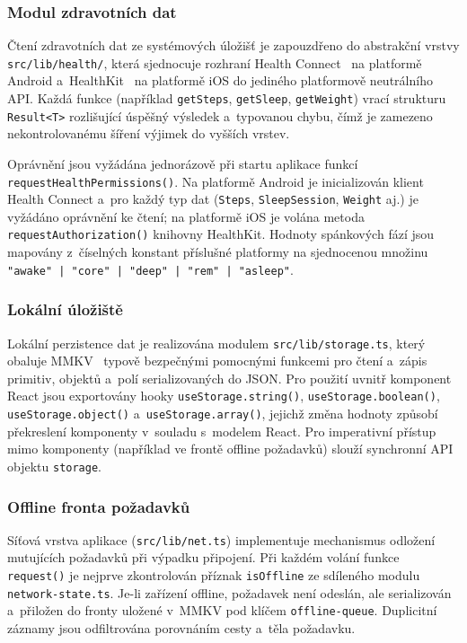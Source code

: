 \subsubsection{Modul zdravotních dat}

{\sloppy
Čtení zdravotních dat ze systémových úložišť je zapouzdřeno do abstrakční
vrstvy \texttt{src/lib/}\allowbreak\texttt{health/}, která sjednocuje rozhraní
Health Connect~\cite{healthconnect2024} na platformě Android
a~HealthKit~\cite{healthkit2024} na platformě iOS do jediného
platformově neutrálního API. Každá funkce (například \texttt{getSteps}, 
\texttt{getSleep}, \texttt{getWeight}) vrací strukturu
\texttt{Result<T>} rozlišující úspěšný výsledek a~typovanou chybu,
čímž je zamezeno nekontrolovanému šíření výjimek do vyšších vrstev.
}

Oprávnění jsou vyžádána jednorázově při startu aplikace funkcí
\texttt{requestHealth\-Permissions()}. Na platformě Android je inicializován
klient Health Connect a~pro každý typ dat (\texttt{Steps},
\texttt{SleepSession}, \texttt{Weight} aj.) je vyžádáno oprávnění ke čtení;
na platformě iOS je volána metoda \texttt{requestAuthorization()} knihovny
HealthKit. Hodnoty spánkových fází jsou mapovány z~číselných konstant
příslušné platformy na sjednocenou množinu
\texttt{"awake"\allowbreak\ | "core"\allowbreak\ | "deep"\allowbreak\ | "rem"\allowbreak\ | "asleep"}.

\subsubsection{Lokální úložiště}

Lokální perzistence dat je realizována modulem \texttt{src/lib/storage.ts},
který obaluje MMKV~\cite{mmkv2024} typově bezpečnými pomocnými funkcemi
pro čtení a~zápis primitiv, objektů a~polí serializovaných do JSON.
Pro použití uvnitř komponent React jsou exportovány hooky
\texttt{useStorage.string()}, \texttt{useStorage.boolean()},
\texttt{useStorage.object()} a~\texttt{useStorage.array()}, jejichž
změna hodnoty způsobí překreslení komponenty v~souladu s~modelem React.
Pro imperativní přístup mimo komponenty (například ve frontě offline
požadavků) slouží synchronní API objektu \texttt{storage}.

\subsubsection{Offline fronta požadavků}

Síťová vrstva aplikace (\texttt{src/lib/net.ts}) implementuje mechanismus
odložení mutujících požadavků při výpadku připojení. Při každém volání
funkce \texttt{request()} je nejprve zkontrolován příznak \texttt{isOffline}
ze sdíleného modulu \texttt{network-state.ts}. Je-li zařízení offline,
požadavek není odeslán, ale serializován a~přiložen do fronty uložené
v~MMKV pod klíčem \texttt{offline-queue}. Duplicitní záznamy jsou
odfiltrována porovnáním cesty a~těla požadavku.

